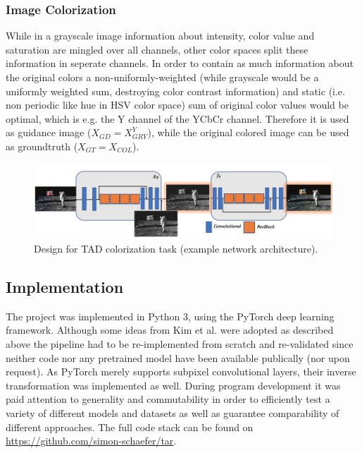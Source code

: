 \subsubsection*{Image Colorization}
While in a grayscale image information about intensity, color value and
saturation are mingled over all channels, other color spaces split these
information in seperate channels. In order to contain as much information about
the original colors a non-uniformly-weighted (while grayscale would be a
uniformly weighted sum, destroying color contrast information) and static
(i.e. non periodic like hue in HSV color space) sum of original color values
would be optimal, which is e.g. the Y channel of the YCbCr channel. Therefore
it is used as guidance image ($X_{GD} = X_{GRY}^Y$), while the original colored
image can be used as groundtruth ($X_{GT} = X_{COL}$).

\begin{figure}[!htbp]
	\centering
	\includegraphics[width=14cm]{figures/architecture_color}
	\caption{Design for \ac{TAD} colorization task (example network architecture).}
  \label{fig:architecture_color}
\end{figure}

\subsection{Implementation}
\label{sec:Approach_IMP}
The project was implemented in Python 3, using the PyTorch deep learning
framework. Although some ideas from Kim et al. \cite{TAID} were adopted as
described above the pipeline had to be re-implemented from scratch and
re-validated since neither code nor any pretrained model have been
available publically (nor upon request). As PyTorch merely supports
subpixel convolutional layers, their inverse transformation was implemented as
well. During program development it was paid attention to generality and
commutability in order to efficiently test a variety of different models and
datasets as well as guarantee comparability of different approaches. The full
code stack can be found on \url{https://github.com/simon-schaefer/tar}.

